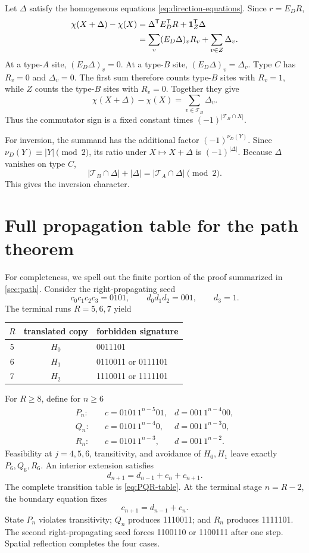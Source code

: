 \documentclass[10pt,letterpaper]{article}
\begin{document}
Let \(\Delta\) satisfy the homogeneous equations \eqref{eq:direction-equations}.  Since \(r=E_DR\),
\begin{align}
 \chi(X+\Delta)-\chi(X)
 &=\Delta^{\mathsf T}E_D^{\mathsf T}R+\mathbf1_Z^{\mathsf T}\Delta\notag\\
 &=\sum_v(E_D\Delta)_vR_v+\sum_{v\in Z}\Delta_v.
\label{eq:character-difference}
\end{align}
At a type-\(A\) site, \((E_D\Delta)_v=0\).  At a type-\(B\) site, \((E_D\Delta)_v=\Delta_v\).  Type \(C\) has \(R_v=0\) and \(\Delta_v=0\).  The first sum therefore counts type-\(B\) sites with \(R_v=1\), while \(Z\) counts the type-\(B\) sites with \(R_v=0\).  Together they give
\[
 \chi(X+\Delta)-\chi(X)=\sum_{v\in\mathcal T_B}\Delta_v.
\]
Thus the commutator sign is a fixed constant times \((-1)^{|\mathcal T_B\cap X|}\).

For inversion, the summand has the additional factor \((-1)^{\nu_D(Y)}\).  Since \(\nu_D(Y)\equiv|Y|\pmod2\), its ratio under \(X\mapsto X+\Delta\) is \((-1)^{|\Delta|}\).  Because \(\Delta\) vanishes on type \(C\),
\[
 |\mathcal T_B\cap\Delta|+|\Delta|
 =|\mathcal T_A\cap\Delta|\pmod2.
\]
This gives the inversion character.

\section{Full propagation table for the path theorem}\label{app:path-proof}

For completeness, we spell out the finite portion of the proof summarized in \cref{sec:path}.  Consider the right-propagating seed
\[
 c_0c_1c_2c_3=0101,
 \qquad
 d_0d_1d_2=001,
 \qquad d_3=1.
\]
The terminal runs \(R=5,6,7\) yield
\begin{center}
\begin{tabular}{ccl}
\toprule
\(R\)&translated copy&forbidden signature\\
\midrule
5&\(H_0\)&0011101\\
6&\(H_1\)&0110011 or 0111101\\
7&\(H_2\)&1110011 or 1111101\\
\bottomrule
\end{tabular}
\end{center}
For \(R\ge8\), define for \(n\ge6\)
\begin{align*}
 P_n:&\quad c=0101\,1^{n-5}01,
 &d=001\,1^{n-4}00,\\
 Q_n:&\quad c=0101\,1^{n-4}0,
 &d=001\,1^{n-3}0,\\
 R_n:&\quad c=0101\,1^{n-3},
 &d=001\,1^{n-2}.
\end{align*}
Feasibility at \(j=4,5,6\), transitivity, and avoidance of \(H_0,H_1\) leave exactly \(P_6,Q_6,R_6\).  An interior extension satisfies
\[
 d_{n+1}=d_{n-1}+c_n+c_{n+1}.
\]
The complete transition table is \eqref{eq:PQR-table}.  At the terminal stage \(n=R-2\), the boundary equation fixes
\[
 c_{n+1}=d_{n-1}+c_n.
\]
State \(P_n\) violates transitivity; \(Q_n\) produces 1110011; and \(R_n\) produces 1111101.  The second right-propagating seed forces 1100110 or 1100111 after one step.  Spatial reflection completes the four cases.
\end{document}
